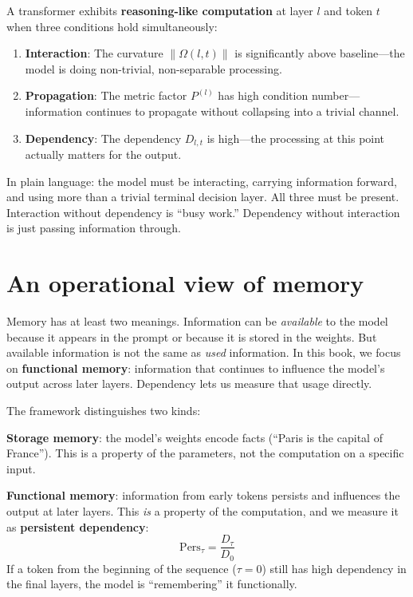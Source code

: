 \documentclass[11pt, twoside, openright]{memoir}
\begin{document}
\begin{keyidea}
A transformer exhibits \textbf{reasoning-like computation} at layer $l$ and
token $t$ when three conditions hold simultaneously:
\begin{enumerate}[nosep]
\item \textbf{Interaction}: The curvature $\|\Omega(l,t)\|$ is
  significantly above baseline---the model is doing non-trivial,
  non-separable processing.
\item \textbf{Propagation}: The metric factor $P^{(l)}$ has high condition
  number---information continues to propagate without collapsing into a
  trivial channel.
\item \textbf{Dependency}: The dependency $D_{l,t}$ is high---the
  processing at this point actually matters for the output.
\end{enumerate}
In plain language: the model must be interacting, carrying information
forward, and using more than a trivial terminal decision layer. All three
must be present. Interaction without dependency is ``busy work.''
Dependency without interaction is just passing information through.
\end{keyidea}

\section{An operational view of memory}

Memory has at least two meanings. Information can be \emph{available} to the
model because it appears in the prompt or because it is stored in the
weights. But available information is not the same as \emph{used}
information. In this book, we focus on \textbf{functional memory}:
information that continues to influence the model's output across later
layers. Dependency lets us measure that usage directly.

The framework distinguishes two kinds:

\textbf{Storage memory}: the model's weights encode facts
(``Paris is the capital of France''). This is a property of the parameters,
not the computation on a specific input.

\textbf{Functional memory}: information from early tokens persists and
influences the output at later layers. This \emph{is} a property of the
computation, and we measure it as \textbf{persistent dependency}:
\[
  \text{Pers}_\tau = \frac{D_\tau}{D_0}
\]
If a token from the beginning of the sequence ($\tau = 0$) still has high
dependency in the final layers, the model is ``remembering'' it functionally.
\end{document}
